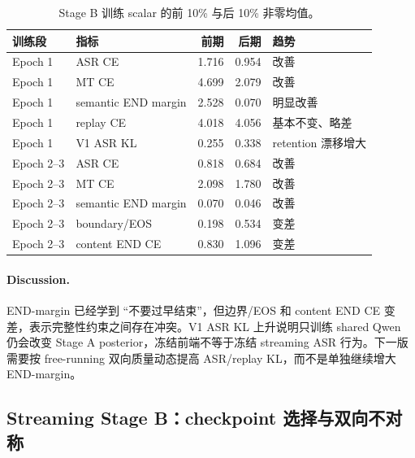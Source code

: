 \documentclass[11pt,a4paper]{article}
\begin{document}
\begin{table}[H]
\centering
\caption{Stage B 训练 scalar 的前 10\% 与后 10\% 非零均值。}
\label{tab:stageb_losses}
\begin{tabularx}{\textwidth}{llrrY}
\toprule
训练段 & 指标 & 前期 & 后期 & 趋势 \\
\midrule
Epoch 1 & ASR CE & 1.716 & 0.954 & 改善 \\
Epoch 1 & MT CE & 4.699 & 2.079 & 改善 \\
Epoch 1 & semantic END margin & 2.528 & 0.070 & 明显改善 \\
Epoch 1 & replay CE & 4.018 & 4.056 & 基本不变、略差 \\
Epoch 1 & V1 ASR KL & 0.255 & 0.338 & retention 漂移增大 \\
Epoch 2--3 & ASR CE & 0.818 & 0.684 & 改善 \\
Epoch 2--3 & MT CE & 2.098 & 1.780 & 改善 \\
Epoch 2--3 & semantic END margin & 0.070 & 0.046 & 改善 \\
Epoch 2--3 & boundary/EOS & 0.198 & 0.534 & 变差 \\
Epoch 2--3 & content END CE & 0.830 & 1.096 & 变差 \\
\bottomrule
\end{tabularx}
\end{table}

\paragraph{Discussion.}
END-margin 已经学到 ``不要过早结束''，但边界/EOS 和 content END CE 变差，表示完整性约束之间存在冲突。V1 ASR KL 上升说明只训练 shared Qwen 仍会改变 Stage A posterior，冻结前端不等于冻结 streaming ASR 行为。下一版需要按 free-running 双向质量动态提高 ASR/replay KL，而不是单独继续增大 END-margin。

\subsection{Streaming Stage B：checkpoint 选择与双向不对称}

\begin{table}[H]
\centering
\caption{Stage B 三个 checkpoint 的 fixed-16 free-running validation。error 越低、chrF/coverage 越高越好。}
\label{tab:stageb_ckpt}
\end{table}
\end{document}
